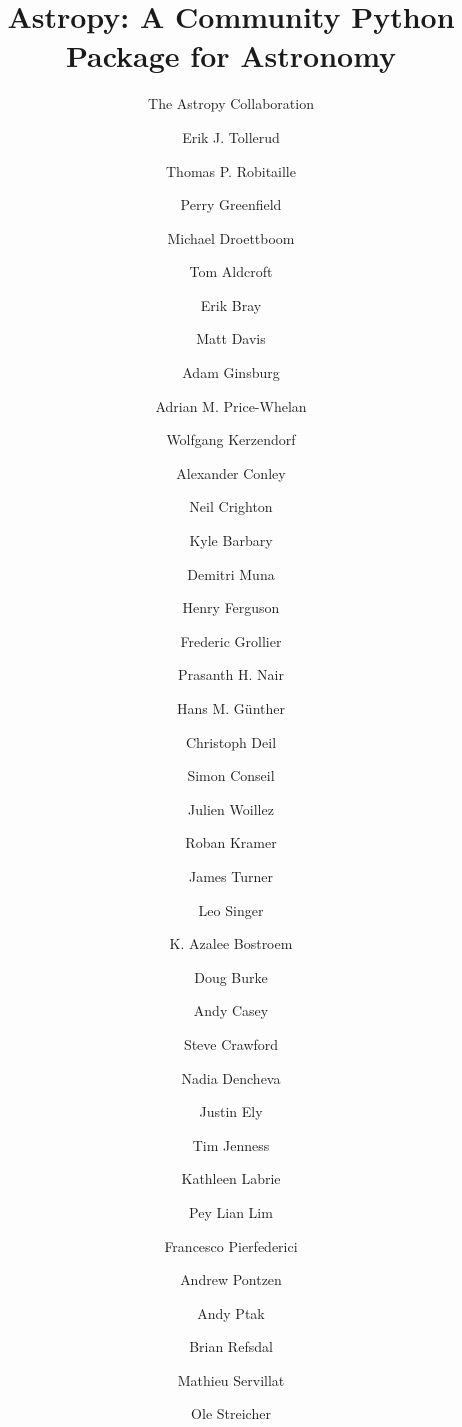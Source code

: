 \documentclass[traditabstract]{aa}
\begin{document}



\title{Astropy: A Community Python Package for Astronomy}




\author{
The Astropy Collaboration
  \and
Erik J. Tollerud\inst{\ref{inst:yale}}  %
  \and
Thomas P. Robitaille\inst{\ref{inst:mpia}}  %
  \and
Perry Greenfield\inst{\ref{inst:stsci}}  %
  \and
Michael Droettboom\inst{\ref{inst:stsci}}  %
  \and
Tom Aldcroft\inst{\ref{inst:cfa}}  %
  \and
Erik Bray\inst{\ref{inst:stsci}}
  \and
Matt Davis\inst{\ref{inst:stsci}}  %
  \and
Adam Ginsburg\inst{\ref{inst:colorado}}  %
  \and
Adrian M. Price-Whelan\inst{\ref{inst:columbia}}  %
  \and
Wolfgang Kerzendorf\inst{\ref{inst:toronto}}
  \and
Alexander Conley\inst{\ref{inst:colorado}}
  \and
Neil Crighton\inst{\ref{inst:mpia}}  %
  \and
Kyle Barbary\inst{\ref{inst:argonne}}  %
  \and
Demitri Muna\inst{\ref{inst:osu}}  %
  \and
Henry Ferguson\inst{\ref{inst:stsci}}
  \and
Frederic Grollier
  \and
Prasanth H. Nair\inst{\ref{inst:freelance}}  %
  \and
Hans M. G\"unther\inst{\ref{inst:cfa}}  %
  \and
Christoph Deil\inst{\ref{inst:mpik}}  %
  \and
Simon Conseil\inst{\ref{inst:oamp}}
  \and
Julien Woillez
  \and
Roban Kramer  %
  \and
James Turner\inst{\ref{inst:gemini_s}}  %
  \and
Leo Singer\inst{\ref{inst:ligo}}  %
  \and
K. Azalee Bostroem\inst{\ref{inst:stsci}}  %
  \and
Doug Burke\inst{\ref{inst:cfa}}  %
  \and
Andy Casey\inst{\ref{inst:stromlo}}  %
  \and
Steve Crawford\inst{\ref{inst:saao}}
  \and
Nadia Dencheva\inst{\ref{inst:stsci}}  %
  \and
Justin Ely\inst{\ref{inst:stsci}}  %
  \and
Tim Jenness\inst{\ref{inst:jac}}  %
  \and
Kathleen Labrie\inst{\ref{inst:gemini_n}}  %
  \and
Pey Lian Lim\inst{\ref{inst:stsci}}  %
  \and
Francesco Pierfederici\inst{\ref{inst:stsci}}  %
  \and
Andrew Pontzen\inst{\ref{inst:oxford}}  %
  \and
Andy Ptak\inst{\ref{inst:gsfc}}  %
  \and
Brian Refsdal  %
  \and
Mathieu Servillat\inst{\ref{inst:saclay}}  %
  \and
Ole Streicher\inst{\ref{inst:leibniz}}  %
}
\end{document}

